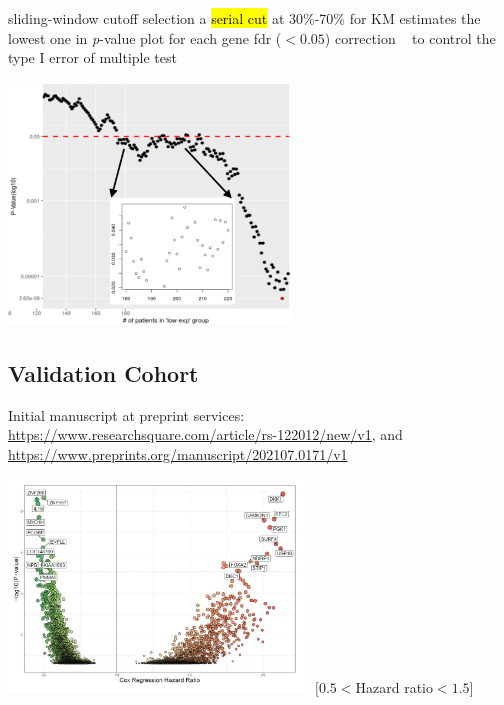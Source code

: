 \documentclass[
paper=landscape,
paper=160mm:90mm, %
fontsize=11pt, %
pagesize, %
parskip=half-, %
]{scrartcl} %
\theoremstyle{mythmstyle} %
\begin{document}
\begin{minipage}[c]{0.45\linewidth}

\begin{outline}

\1 sliding-window cutoff selection
    \2 a \hl{serial cut} at 30\%-70\% for KM estimates
    \2 the lowest one in \textit{p}-value plot for each gene
\2  \acrfull{fdr} ($ < 0.05$) correction {\tiny ~\autocite{Benjamini1995a}} to control the type I error of multiple test 


\end{outline}
\end{minipage}
\begin{minipage}[c]{0.35\linewidth}
\includegraphics[width=7.5cm]{Rplot_pvaluePlot_NDFIP1.pdf}
\end{minipage}



\clearpage

\subsection{Validation Cohort}

Initial manuscript at preprint services: \url{https://www.researchsquare.com/article/rs-122012/new/v1}, and \url{https://www.preprints.org/manuscript/202107.0171/v1}

\includegraphics[width=8cm]{fcaf149553b93b72bd044c41.jpg} {\tiny $[0.5<$Hazard ratio$<1.5]$}
\end{document}
